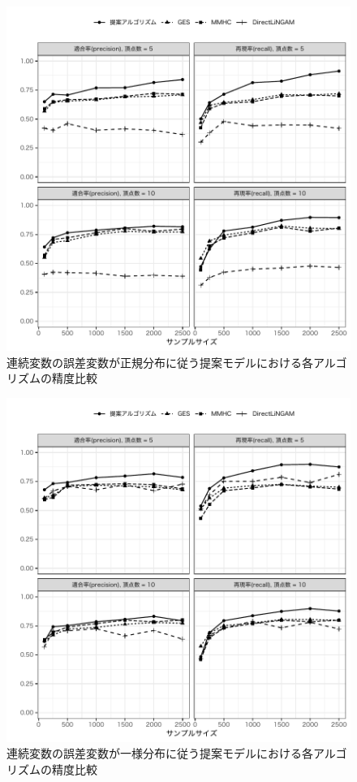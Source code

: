 \begin{figure}[H]
  \includegraphics[width=13cm, bb=9 9 358 434]{./picture/plot_gaussian.pdf}
  \caption{連続変数の誤差変数が正規分布に従う提案モデルにおける各アルゴリズムの精度比較}
  \label{fig:plot_gaussian}
\end{figure}

\begin{figure}[H]
  \includegraphics[width=13cm, bb=9 9 358 434]{./picture/plot_uniform.pdf}
  \caption{連続変数の誤差変数が一様分布に従う提案モデルにおける各アルゴリズムの精度比較}
  \label{fig:plot_uniform}
\end{figure}
